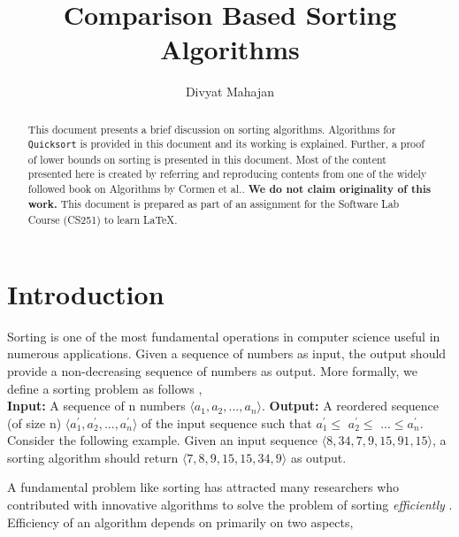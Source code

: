 \documentclass[a4paper, 10pt,twocolumn]{article}
\title{Comparison Based Sorting Algorithms}
\author{Divyat Mahajan}
\date{}
\begin{document}
\maketitle
\begin{abstract}
This document presents a brief discussion on sorting algorithms. Algorithms for \texttt{Quicksort} is provided in this document and its working is explained. Further, a proof of lower bounds on sorting is presented in this document. Most of the content presented here is created by referring and reproducing contents from one of the widely followed book on Algorithms by Cormen et al.\cite{comen}. \textbf{We do not claim originality of this work.} This document is prepared as part of an assignment for the Software Lab Course (CS251) to learn \LaTeX. \\


\end{abstract}    
\section{Introduction}
Sorting is one of the most fundamental operations in computer science useful in numerous applications. Given a sequence of numbers as input, the output should provide a non-decreasing sequence of numbers as output. More formally, we define a sorting problem as follows \cite{comen}, \\
\textbf{Input:} A sequence of n numbers $ \langle a_{1},a_{2},...,a_{n} \rangle $.
\textbf{Output:} A reordered sequence (of size n) $ \langle a_{1}^{'},a_{2}^{'},...,a_{n}^{'} \rangle $ of the input sequence such that $a_{1}^{'}\leq$ $a_{2}^{'}\leq$ ...$\leq a_{n}^{'}$. \\ 
Consider the following example. Given an input sequence $ \langle 8, 34, 7, 9, 15, 91, 15 \rangle $, a sorting algorithm  should return $ \langle 7, 8, 9, 15, 15, 34, 9 \rangle $ as output. \par
A fundamental problem like sorting has attracted many researchers who contributed with innovative algorithms to solve the problem of sorting \textit{efficiently} \cite{martin}. Efficiency of an algorithm depends on primarily on two aspects, 
\end{document}
